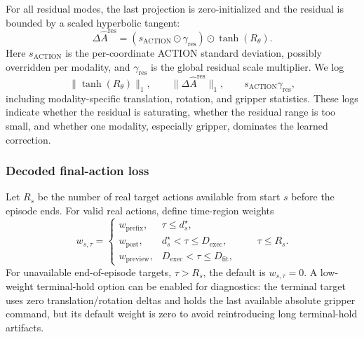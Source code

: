 \documentclass[10pt,twocolumn,letterpaper]{article}
\begin{document}
For all residual modes, the last projection is zero-initialized and the residual is bounded by a scaled hyperbolic tangent:
\begin{equation}
\Delta \hat A^{\mathrm{res}}
=
\left(s_{\mathrm{ACTION}}\odot \gamma_{\mathrm{res}}\right)
\odot \tanh(R_\theta).
\end{equation}
Here $s_{\mathrm{ACTION}}$ is the per-coordinate ACTION standard deviation, possibly overridden per modality, and $\gamma_{\mathrm{res}}$ is the global residual scale multiplier. We log
\begin{equation}
\|\tanh(R_\theta)\|_1,
\qquad
\|\Delta \hat A^{\mathrm{res}}\|_1,
\qquad
s_{\mathrm{ACTION}}\gamma_{\mathrm{res}},
\end{equation}
including modality-specific translation, rotation, and gripper statistics. These logs indicate whether the residual is saturating, whether the residual range is too small, and whether one modality, especially gripper, dominates the learned correction.

\subsubsection*{Decoded final-action loss}
Let $R_s$ be the number of real target actions available from start $s$ before the episode ends. For valid real actions, define time-region weights
\begin{equation}
w_{s,\tau}=\begin{cases}
w_{\mathrm{prefix}}, & \tau\le d_s^{\star},\\
w_{\mathrm{post}}, & d_s^{\star}<\tau\le D_{\mathrm{exec}},\\
w_{\mathrm{preview}}, & D_{\mathrm{exec}}<\tau\le D_{\mathrm{fit}},
\end{cases}
\qquad \tau\le R_s.
\end{equation}
For unavailable end-of-episode targets, $\tau>R_s$, the default is $w_{s,\tau}=0$. A low-weight terminal-hold option can be enabled for diagnostics: the terminal target uses zero translation/rotation deltas and holds the last available absolute gripper command, but its default weight is zero to avoid reintroducing long terminal-hold artifacts.
\end{document}
